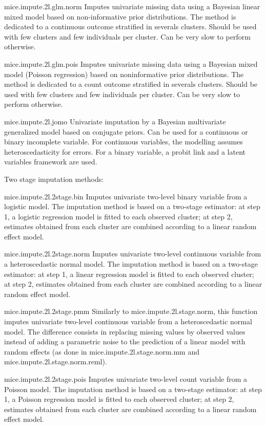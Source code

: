 \documentclass[]{book}
\theoremstyle{definition}
\theoremstyle{definition}
\theoremstyle{definition}
\theoremstyle{remark}
\begin{document}
mice.impute.2l.glm.norm Imputes univariate missing data using a Bayesian
linear mixed model based on non-informative prior distributions. The
method is dedicated to a continuous outcome stratified in severals
clusters. Should be used with few clusters and few individuals per
cluster. Can be very slow to perform otherwise.

mice.impute.2l.glm.pois Imputes univariate missing data using a Bayesian
mixed model (Poisson regression) based on noninformative prior
distributions. The method is dedicated to a count outcome stratified in
severals clusters. Should be used with few clusters and few individuals
per cluster. Can be very slow to perform otherwise.

mice.impute.2l.jomo Univariate imputation by a Bayesian multivariate
generalized model based on conjugate priors. Can be used for a
continuous or binary incomplete variable. For continuous variables, the
modelling assumes heteroscedasticity for errors. For a binary variable,
a probit link and a latent variables framework are used.

Two stage imputation methods:

mice.impute.2l.2stage.bin Imputes univariate two-level binary variable
from a logistic model. The imputation method is based on a two-stage
estimator: at step 1, a logistic regression model is fitted to each
observed cluster; at step 2, estimates obtained from each cluster are
combined according to a linear random effect model.

mice.impute.2l.2stage.norm Imputes univariate two-level continuous
variable from a heteroscedastic normal model. The imputation method is
based on a two-stage estimator: at step 1, a linear regression model is
fitted to each observed cluster; at step 2, estimates obtained from each
cluster are combined according to a linear random effect model.

mice.impute.2l.2stage.pmm Similarly to mice.impute.2l.stage.norm, this
function imputes univariate two-level continuous variable from a
heteroscedastic normal model. The difference consists in replacing
missing values by observed values instead of adding a parametric noise
to the prediction of a linear model with random effects (as done in
mice.impute.2l.stage.norm.mm and mice.impute.2l.stage.norm.reml).

mice.impute.2l.2stage.pois Imputes univariate two-level count variable
from a Poisson model. The imputation method is based on a two-stage
estimator: at step 1, a Poisson regression model is fitted to each
observed cluster; at step 2, estimates obtained from each cluster are
combined according to a linear random effect model.
\end{document}
